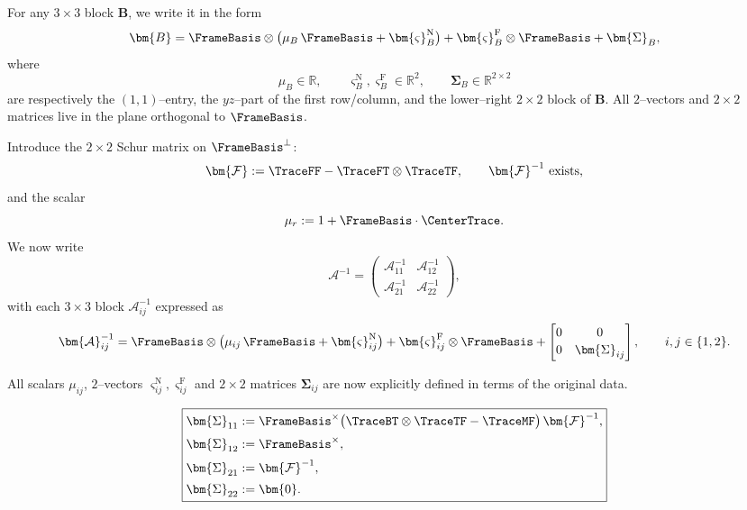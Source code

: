 For any $3\times3$ block $\bm{B}$, we write it in the form
\[
\bm{B}
=
\FrameBasis\otimes\bigl(\mu_B\,\FrameBasis + \bm{\varsigma}_B^{\mathrm{N}}\bigr)
+
\bm{\varsigma}_B^{\mathrm{F}}\otimes\FrameBasis
+\bm{\Sigma}_B,
\]
where
\[
\mu_B\in\mathbb{R},\qquad
\bm{\varsigma}_B^{\mathrm{N}},\bm{\varsigma}_B^{\mathrm{F}}\in\mathbb{R}^2,
\qquad
\bm{\Sigma}_B\in\mathbb{R}^{2\times2}
\]
are respectively the $(1,1)$–entry, the $yz$–part of the first row/column, and the lower–right $2\times2$ block of $\bm{B}$.
All $2$–vectors and $2\times2$ matrices live in the plane orthogonal to $\FrameBasis$.

%
%
Introduce the $2\times2$ Schur matrix on $\FrameBasis^\perp$:
\[
\bm{\mathcal{F}}
:=
\TraceFF - \TraceFT\otimes\TraceTF,
\qquad
\bm{\mathcal{F}}^{-1}\ \text{exists},
\]
and the scalar
\[
\mu_r := 1 + \FrameBasis\cdot\CenterTrace.
\]
%
%
We now write
\[
\bm{\mathcal{A}}^{-1}
=
\begin{pmatrix}
\bm{\mathcal{A}}_{11}^{-1} & \bm{\mathcal{A}}_{12}^{-1}\\[2pt]
\bm{\mathcal{A}}_{21}^{-1} & \bm{\mathcal{A}}_{22}^{-1}
\end{pmatrix},
\]
with each $3\times3$ block $\bm{\mathcal{A}}_{ij}^{-1}$ expressed as
\[
\bm{\mathcal{A}}_{ij}^{-1}
=
\FrameBasis\otimes\bigl(\mu_{ij}\,\FrameBasis + \bm{\varsigma}_{ij}^{\mathrm{N}}\bigr)
+
\bm{\varsigma}_{ij}^{\mathrm{F}}\otimes\FrameBasis
+
\begin{bmatrix}
0 & 0\\[2pt]
0 & \bm{\Sigma}_{ij}
\end{bmatrix},
\qquad i,j\in\{1,2\}.
\]

All scalars $\mu_{ij}$, $2$–vectors $\bm{\varsigma}_{ij}^{\mathrm{N}},\bm{\varsigma}_{ij}^{\mathrm{F}}$ and
$2\times2$ matrices $\bm{\Sigma}_{ij}$ are now explicitly defined in terms of the original data.


\[
\boxed{
\begin{aligned}
\bm{\Sigma}_{11}
&:=
\FrameBasis^\times\bigl(\TraceBT\otimes\TraceTF - \TraceMF\bigr)\,\bm{\mathcal{F}}^{-1},
\\[2pt]
\bm{\Sigma}_{12}
&:= \FrameBasis^\times,
\\[2pt]
\bm{\Sigma}_{21}
&:= \bm{\mathcal{F}}^{-1},
\\[2pt]
\bm{\Sigma}_{22}
&:= \bm{0}.
\end{aligned}
}
\]

